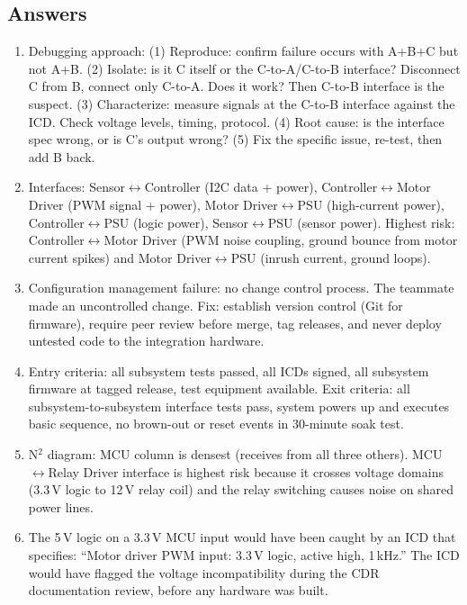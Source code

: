 \documentclass[11pt,letterpaper,twoside,openany]{book}
\begin{document}
\subsection{Answers}
\begin{enumerate}[leftmargin=1.5em]
\item Debugging approach: (1) Reproduce: confirm failure occurs with A+B+C but not A+B. (2) Isolate: is it C itself or the C-to-A/C-to-B interface? Disconnect C from B, connect only C-to-A. Does it work? Then C-to-B interface is the suspect. (3) Characterize: measure signals at the C-to-B interface against the ICD. Check voltage levels, timing, protocol. (4) Root cause: is the interface spec wrong, or is C's output wrong? (5) Fix the specific issue, re-test, then add B back.
\item Interfaces: Sensor$\leftrightarrow$Controller (I2C data + power), Controller$\leftrightarrow$Motor Driver (PWM signal + power), Motor Driver$\leftrightarrow$PSU (high-current power), Controller$\leftrightarrow$PSU (logic power), Sensor$\leftrightarrow$PSU (sensor power). Highest risk: Controller$\leftrightarrow$Motor Driver (PWM noise coupling, ground bounce from motor current spikes) and Motor Driver$\leftrightarrow$PSU (inrush current, ground loops).
\item Configuration management failure: no change control process. The teammate made an uncontrolled change. Fix: establish version control (Git for firmware), require peer review before merge, tag releases, and never deploy untested code to the integration hardware.
\item Entry criteria: all subsystem tests passed, all ICDs signed, all subsystem firmware at tagged release, test equipment available. Exit criteria: all subsystem-to-subsystem interface tests pass, system powers up and executes basic sequence, no brown-out or reset events in 30-minute soak test.
\item N$^2$ diagram: MCU column is densest (receives from all three others). MCU$\leftrightarrow$Relay Driver interface is highest risk because it crosses voltage domains (3.3\,V logic to 12\,V relay coil) and the relay switching causes noise on shared power lines.
\item The 5\,V logic on a 3.3\,V MCU input would have been caught by an ICD that specifies: ``Motor driver PWM input: 3.3\,V logic, active high, 1\,kHz.'' The ICD would have flagged the voltage incompatibility during the CDR documentation review, before any hardware was built.
\end{enumerate}
\end{document}
